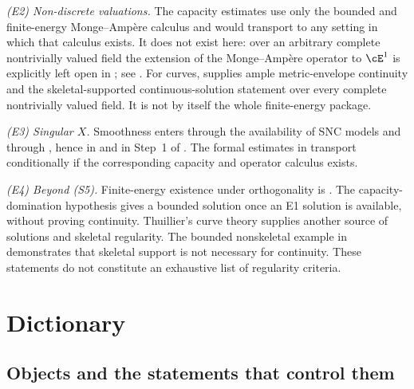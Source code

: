 \emph{(E2) Non-discrete valuations.}  The capacity estimates use only the
bounded and finite-energy Monge--Amp\`ere calculus and would transport to
any setting in which that calculus exists.  It does not exist here: over an
arbitrary complete nontrivially valued field the extension of the
Monge--Amp\`ere operator to $\cE^1$ is explicitly left open in
\cite[Remark~4.4]{PS23Hybrid}; see .  For
curves,  supplies ample
metric-envelope continuity and the skeletal-supported continuous-solution
statement over every complete nontrivially valued field.  It is not by
itself the whole finite-energy package.

\emph{(E3) Singular $X$.}  Smoothness enters through the availability of
SNC models and through
, hence in
 and in Step~1 of
.  The formal estimates in  transport
conditionally if the corresponding capacity and operator calculus exists.

\emph{(E4) Beyond \textup{(S5)}.} Finite-energy existence under
orthogonality is .
The capacity-domination hypothesis gives a bounded solution once an E1
solution is available, without proving continuity.  Thuillier's curve
theory supplies another source of solutions and skeletal regularity.
The bounded nonskeletal example in
 demonstrates that skeletal support
is not necessary for continuity.  These statements do not constitute an
exhaustive list of regularity criteria.

\section{Dictionary}
\label{sec:ch29-dictionary}

\subsection{Objects and the statements that control them}
\label{sec:ch29-dict-objects}

